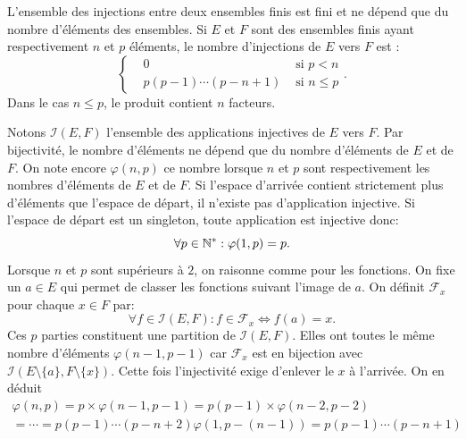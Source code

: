 \begin{propn}
 L'ensemble des injections entre deux ensembles finis est fini et ne dépend que du nombre d'éléments des ensembles. Si $E$ et $F$ sont des ensembles finis ayant respectivement $n$ et $p$ éléments, le nombre d'injections de $E$ vers $F$ est :
\[
\left\lbrace
\begin{aligned}
 &0 &\text{ si } p<n \\
 & p(p-1)\cdots(p-n+1) &\text{ si } n\leq p 
\end{aligned}
\right. . 
\]
Dans le cas $n\leq p$, le produit contient $n$ facteurs.
\end{propn}
\begin{demo}
 Notons $\mathcal{I}(E,F)$ l'ensemble des applications injectives de $E$ vers $F$. Par bijectivité, le nombre d'éléments ne dépend que du nombre d'éléments de $E$ et de $F$. On note encore $\varphi(n,p)$ ce nombre lorsque $n$ et $p$ sont respectivement les nombres d'éléments de $E$ et de $F$.\newline
Si l'espace d'arrivée contient strictement plus d'éléments que l'espace de départ, il n'existe pas d'application injective. Si l'espace de départ est un singleton, toute application est injective donc:
\begin{displaymath}
 \forall p\in \mathbb{N}^* : \varphi(1,p) = p.
\end{displaymath}
 Lorsque $n$ et $p$ sont supérieurs à $2$, on raisonne comme pour les fonctions. On fixe un $a\in E$ qui permet de classer les fonctions suivant l'image de $a$. On définit $\mathcal F_x$ pour chaque $x\in F$ par:
\begin{displaymath}
 \forall f\in \mathcal I(E,F) : f\in \mathcal F_x \Leftrightarrow f(a)=x .
\end{displaymath}
Ces $p$ parties constituent une partition de $\mathcal I(E,F)$.\newline
Elles ont toutes le même nombre d'éléments $\varphi(n-1,p-1)$ car $\mathcal F_x$ est en bijection avec $\mathcal I(E\setminus\{a\},F\setminus\{x\})$. Cette fois l'injectivité exige d'enlever le $x$ à l'arrivée.\newline
On en déduit
\begin{multline*}
 \varphi(n,p)= p\times\varphi(n-1,p-1) = p(p-1)\times\varphi(n-2,p-2)\\
=\cdots = p(p-1)\cdots (p-n+2)\varphi(1,p-(n-1))= p(p-1)\cdots (p-n+1)
\end{multline*}
 
\end{demo}

